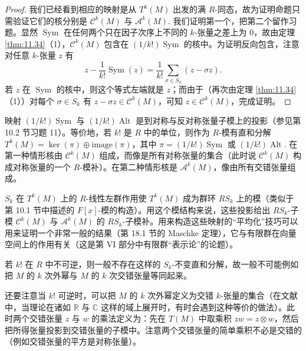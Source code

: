 \begin{proof}
我们已经看到相应的映射是从 \(T^k(M)\) 出发的满 \(R\)-同态，故为证明命题只需验证它们的核分别是 \(\mathcal{C}^k(M)\) 与 \(\mathcal{A}^k(M)\). 我们证明第一个，把第二个留作习题。显然 \(\operatorname{Sym}\) 在任何两个只在因子次序上不同的 \(k\)-张量之差上为 0，故由定理 \ref{thm:11.34}（1），\(\mathcal{C}^k(M)\) 包含在 \((1/k!)\operatorname{Sym}\) 的核中。为证明反向包含，注意对任意 \(k\)-张量 \(z\) 有
\[
z-\frac{1}{k!}\operatorname{Sym}(z) = \frac{1}{k!}\sum_{\sigma \in S_k}(z-\sigma z).
\]
若 \(z\) 在 \(\operatorname{Sym}\) 的核中，则这个等式左端就是 \(z\)；而由于（再次由定理 \ref{thm:11.34}（1））对每个 \(\sigma \in S_k\) 有 \(z-\sigma z \in \mathcal{C}^k(M)\)，可知 \(z \in \mathcal{C}^k(M)\)，完成证明。
\end{proof}

映射 \((1/k!)\operatorname{Sym}\) 与 \((1/k!)\operatorname{Alt}\) 是到对称与反对称张量子模上的投影（参见第 10.2 节习题 11）。等价地，若 \(k!\) 是 \(R\) 中的单位，则作为 \(R\)-模有直和分解 \(T^k(M) = \ker(\pi) \oplus \mathrm{image}(\pi)\)，其中 \(\pi = (1/k!)\operatorname{Sym}\) 或 \((1/k!)\operatorname{Alt}\). 在第一种情形核由 \(\mathcal{C}^k(M)\) 组成，而像是所有对称张量的集合（此时说 \(\mathcal{C}^k(M)\) 构成对称张量的一个 \(R\)-模补）。在第二种情形核是 \(\mathcal{A}^k(M)\)，像由所有交错张量组成。

\(S_k\) 在 \(T^k(M)\) 上的 \(R\)-线性左群作用使 \(T^k(M)\) 成为群环 \(RS_k\) 上的模（类似于第 10.1 节中描述的 \(F[x]\)-模的构造）。用这个模结构来说，这些投影给出 \(RS_k\)-子模 \(\mathcal{C}^k(M)\) 与 \(\mathcal{A}^k(M)\) 的 \(RS_k\)-子模补。用来构造这些映射的“平均化”技巧可以用来证明一个非常一般的结果（第 18.1 节的 Maschke 定理），它与有限群在向量空间上的作用有关（这是第 VI 部分中有限群“表示论”的论题）。

若 \(k!\) 在 \(R\) 中不可逆，则一般不存在这样的 \(S_k\)-不变直和分解，故一般不可能例如把 \(M\) 的 \(k\) 次外幂与 \(M\) 的 \(k\) 次交错张量等同起来。

还要注意当 \(k!\) 可逆时，可以把 \(M\) 的 \(k\) 次外幂定义为交错 \(k\)-张量的集合（在文献中，当理论在诸如 \(\mathbb{R}\) 与 \(\mathbb{C}\) 这样的域上展开时，有时会遇到这种等价的做法）。此时两个交错张量 \(z\) 与 \(w\) 的乘法定义为：先在 \(T(M)\) 中取乘积 \(zw = z \otimes w\)，然后把所得张量投影到交错张量的子模中。注意两个交错张量的简单乘积不必是交错的（例如交错张量的平方是对称张量）。

